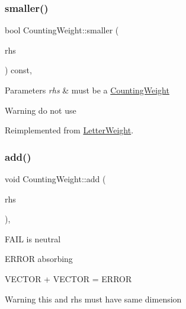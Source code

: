 \mbox{\label{group__weight_ga149e9ae84c83b9235d512c68fec54d1c}} 
\subsubsection{\texorpdfstring{smaller()}{smaller()}\hspace{0.1cm}{\footnotesize\ttfamily [1/4]}}
{\footnotesize\ttfamily bool Counting\+Weight\+::smaller (\begin{DoxyParamCaption}\item[{const \mbox{\hyperlink{classLetterWeight}{Letter\+Weight}} $\ast$}]{rhs }\end{DoxyParamCaption}) const\hspace{0.3cm}{\ttfamily [protected]}, {\ttfamily [virtual]}}


\begin{DoxyParams}{Parameters}
{\em rhs} & must be a \mbox{\hyperlink{classCountingWeight}{Counting\+Weight}} \\
\hline
\end{DoxyParams}
\begin{DoxyWarning}{Warning}
do not use 
\end{DoxyWarning}


Reimplemented from \mbox{\hyperlink{group__weight_ga0ef9dd9bcd765c0e3c50b384b34d88d2}{Letter\+Weight}}.

\mbox{\label{group__weight_ga01ca779f7d5378564f4419150d7ae1f5}} 
\subsubsection{\texorpdfstring{add()}{add()}\hspace{0.1cm}{\footnotesize\ttfamily [1/5]}}
{\footnotesize\ttfamily void Counting\+Weight\+::add (\begin{DoxyParamCaption}\item[{const \mbox{\hyperlink{classLetterWeight}{Letter\+Weight}} $\ast$}]{rhs }\end{DoxyParamCaption})\hspace{0.3cm}{\ttfamily [protected]}, {\ttfamily [virtual]}}


\begin{DoxyItemize}
\item F\+A\+IL is neutral
\item E\+R\+R\+OR absorbing
\item V\+E\+C\+T\+OR + V\+E\+C\+T\+OR = E\+R\+R\+OR \begin{DoxyWarning}{Warning}
this and rhs must have same dimension 
\end{DoxyWarning}

\end{DoxyItemize}

